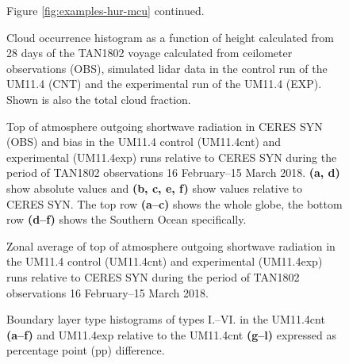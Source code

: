 \clearpage

\begin{figure}[t]
\caption{Figure \ref{fig:examples-hur-mcu} continued.
}
\label{fig:examples-hur-mcu-cont}
\end{figure}

\clearpage

\begin{figure}[t]
\caption{
Cloud occurrence histogram as a function of height calculated from
28 days of the TAN1802 voyage calculated from ceilometer observations (OBS),
simulated lidar data in the control run of the UM11.4 (CNT) and
the experimental run of the UM11.4 (EXP).
Shown is also the total cloud fraction.
}
\label{fig:cloud-occurrence}
\end{figure}

\clearpage

\begin{figure}[t]
\caption{Top of atmosphere outgoing shortwave radiation in CERES SYN (OBS) and
bias in the UM11.4 control (UM11.4cnt) and experimental (UM11.4exp) runs relative
to CERES SYN during the period of TAN1802 observations 16 February--15 March 2018.
\textbf{(a, d)} show absolute values and \textbf{(b, c, e, f)} show values relative
to CERES SYN. The top row \textbf{(a--c)} shows the whole globe, the bottom
row \textbf{(d--f)} shows the Southern Ocean specifically.
}
\label{fig:sw}
\end{figure}

\clearpage

\begin{figure}[t]
\caption{
Zonal average of top of atmosphere outgoing shortwave radiation in
the UM11.4 control (UM11.4cnt) and experimental (UM11.4exp) runs relative
to CERES SYN during the period of TAN1802 observations 16 February--15 March 2018. 
}
\label{fig:sw-zonal}
\end{figure}

\clearpage


\begin{figure}[t]
\caption{Boundary layer type histograms of types I.--VI. \citep{lock2000} in the UM11.4cnt
\textbf{(a--f)} and UM11.4exp relative to the UM11.4cnt \textbf{(g--l)} expressed as percentage point (pp)
difference.
}
\label{fig:bdyt}
\end{figure}

